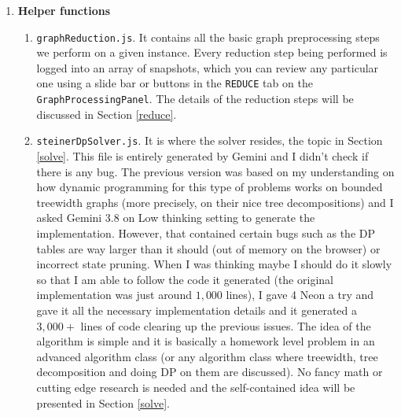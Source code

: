 \documentclass[11pt]{article}
\theoremstyle{definition}
\theoremstyle{remark}
\begin{document}
\begin{enumerate}
\begin{enumerate}
        \item[$\circ$] \texttt{user.js} (\texttt{userStore}). New properties associated with various view modes were added here. Originally the quick select function for select/unselect target directly by clicking the node icon was implemented here but it is probably not in use anymore after most of the stuff is moved to \texttt{graph.js} (\texttt{graphStore}).

        \item[$\circ$] \texttt{graph.js} (\texttt{graphStore}). Completely new Pinia store that I added. It manages data needed by the \texttt{GraphProcessingPanel}. Many new things in \texttt{NodeMap} also depend on it, especially under the abstract view mode.
    \end{enumerate}

    \item[$\bullet$] \textbf{Helper functions} 
    \begin{enumerate}
        \item[$\circ$] \texttt{graphReduction.js}. It contains all the basic graph preprocessing steps we perform on a given instance. Every reduction step being performed is logged into an array of snapshots, which you can review any particular one using a slide bar or buttons in the \texttt{REDUCE} tab on the \texttt{GraphProcessingPanel}. The details of the reduction steps will be discussed in Section \ref{reduce}.

        \item[$\circ$] \texttt{steinerDpSolver.js}. It is where the solver resides, the topic in Section \ref{solve}. This file is entirely generated by Gemini and I didn't check if there is any bug. The previous version was based on my understanding on how dynamic programming for this type of problems works on bounded treewidth graphs (more precisely, on their nice tree decompositions) and I asked Gemini 3.8 on Low thinking setting to generate the implementation. However, that contained certain bugs such as the DP tables are way larger than it should (out of memory on the browser) or incorrect state pruning. When I was thinking maybe I should do it slowly so that I am able to follow the code it generated (the original implementation was just around $1,000$ lines), I gave 4 Neon a try and gave it all the necessary implementation details and it generated a $3,000+$ lines of code clearing up the previous issues. The idea of the algorithm is simple and it is basically a homework level problem in an advanced algorithm class (or any algorithm class where treewidth, tree decomposition and doing DP on them are discussed). No fancy math or cutting edge research is needed and the self-contained idea will be presented in Section \ref{solve}.
    \end{enumerate}
\end{enumerate}
\end{document}
